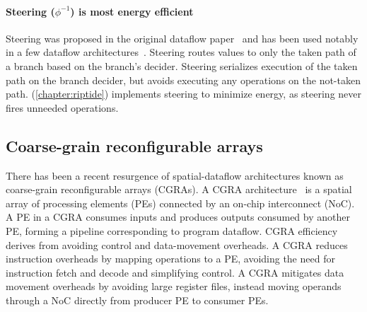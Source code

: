 \paragraph{Steering ($\phi^{-1}$) is most energy efficient}
%
Steering was proposed in the original dataflow paper~\cite{dennis1975preliminary}
and has been used notably in a few dataflow architectures~\cite{swanson2003wavescalar,dataflow-a-complement,mishra2006tartan,beret,seed}.
% 
Steering routes values to only the taken path of a branch based on the branch's
decider.
%
Steering serializes execution of the taken path on the branch decider, but
avoids executing any operations on the not-taken path.
%
\riptide (\autoref{chapter:riptide}) implements steering to minimize energy,
as steering never fires unneeded operations. 

\subsection{Coarse-grain reconfigurable arrays}
There has been a recent resurgence of spatial-dataflow architectures known as coarse-grain reconfigurable arrays (CGRAs).
% 
A CGRA architecture~\cite{remarc,adres,matrix,dyser,revamp,opencgra,cgrame,wave,nguyen2021fifer,morphosys,mozart,ppa,fpca,plasticine,dadu2019towards,parashar2013triggered,capstan,nowatzki:isca17:stream-dataflow,goldstein2000piperench,weng2020dsagen,weng2020hybrid,voitsechov2014single,mishra2006tartan,tan2018stitch,karunaratne2017hycube,voitsechov2018inter,evx} is a spatial array of
processing elements (PEs) connected by an on-chip interconnect (NoC).
%
A PE in a CGRA consumes inputs and produces outputs 
consumed by another PE, forming a pipeline corresponding to 
program dataflow.
%
CGRA efficiency derives from avoiding control and data-movement overheads.
%
A CGRA reduces instruction overheads by mapping operations to a PE,
avoiding the need for instruction fetch and decode and simplifying control.
%
A CGRA mitigates data movement overheads by avoiding large register
files, instead moving operands through a NoC directly from 
producer PE to consumer PEs.

